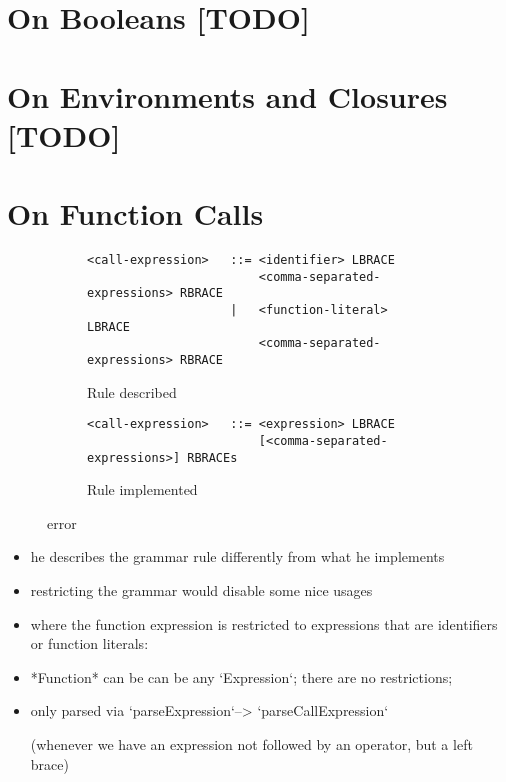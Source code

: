 \documentclass[a4paper,10pt]{article}
\begin{document}
\clearpage
\newpage
\section{On Booleans [TODO]}


\newpage
\section{On Environments and Closures [TODO]}


\newpage
\section{On Function Calls}

\begin{figure}[h]
\begin{subfigure}{\textwidth}

\begin{tcolorbox}\small
\begin{verbatim}
<call-expression>   ::= <identifier> LBRACE 
                        <comma-separated-expressions> RBRACE 
                    |   <function-literal> LBRACE 
                        <comma-separated-expressions> RBRACE
\end{verbatim}
\end{tcolorbox}
\caption{Rule described}
\end{subfigure}
\begin{subfigure}{\textwidth}

\begin{tcolorbox}\small
\begin{verbatim}
<call-expression>   ::= <expression> LBRACE 
                        [<comma-separated-expressions>] RBRACEs
\end{verbatim}
\end{tcolorbox}
\caption{Rule implemented}
\end{subfigure}
 \caption{error}
  \label{error-func}
\end{figure}




\begin{itemize}
 \item he describes the grammar rule differently from what he implements
 \item restricting the grammar would disable some nice usages
\item where the function expression is restricted to expressions that are identifiers or function literals:
\item *Function* can be can be any `Expression`; there are no restrictions;
\item only parsed via `parseExpression`--> `parseCallExpression` 

(whenever we have an expression not followed by an operator, but a left brace)

\end{itemize}
\end{document}
